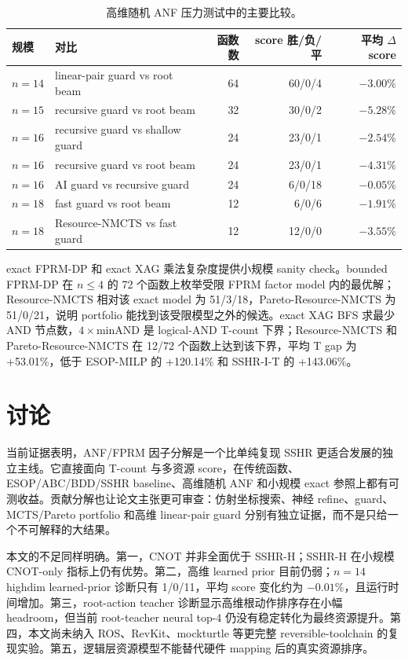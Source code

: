\documentclass[UTF8,fontset=macnew,11pt]{ctexart}
\newcommand{\method}{Resource-NMCTS}
\newcommand{\pareto}{Pareto-Resource-NMCTS}
\begin{document}
\begin{table}[t]
\centering
\small
\caption{高维随机 ANF 压力测试中的主要比较。}
\label{tab:highdim}
\begin{tabularx}{\linewidth}{llrrr}
\toprule
规模 & 对比 & 函数数 & score 胜/负/平 & 平均 $\Delta$ score \\
\midrule
$n=14$ & linear-pair guard vs root beam & 64 & 60/0/4 & $-3.00\%$ \\
$n=15$ & recursive guard vs root beam & 32 & 30/0/2 & $-5.28\%$ \\
$n=16$ & recursive guard vs shallow guard & 24 & 23/0/1 & $-2.54\%$ \\
$n=16$ & recursive guard vs root beam & 24 & 23/0/1 & $-4.31\%$ \\
$n=16$ & AI guard vs recursive guard & 24 & 6/0/18 & $-0.05\%$ \\
$n=18$ & fast guard vs root beam & 12 & 6/0/6 & $-1.91\%$ \\
$n=18$ & \method{} vs fast guard & 12 & 12/0/0 & $-3.55\%$ \\
\bottomrule
\end{tabularx}
\end{table}

exact FPRM-DP 和 exact XAG 乘法复杂度提供小规模 sanity check。bounded FPRM-DP 在 $n\leq4$ 的 72 个函数上枚举受限 FPRM factor model 内的最优解；\method{} 相对该 exact model 为 51/3/18，\pareto{} 为 51/0/21，说明 portfolio 能找到该受限模型之外的候选。exact XAG BFS 求最少 AND 节点数，$4\times\mathrm{minAND}$ 是 logical-AND T-count 下界；\method{} 和 \pareto{} 在 12/72 个函数上达到该下界，平均 T gap 为 +53.01\%，低于 ESOP-MILP 的 +120.14\% 和 SSHR-I-T 的 +143.06\%。

\section{讨论}

当前证据表明，ANF/FPRM 因子分解是一个比单纯复现 SSHR 更适合发展的独立主线。它直接面向 T-count 与多资源 score，在传统函数、ESOP/ABC/BDD/SSHR baseline、高维随机 ANF 和小规模 exact 参照上都有可测收益。贡献分解也让论文主张更可审查：仿射坐标搜索、神经 refine、guard、MCTS/Pareto portfolio 和高维 linear-pair guard 分别有独立证据，而不是只给一个不可解释的大结果。

本文的不足同样明确。第一，CNOT 并非全面优于 SSHR-H；SSHR-H 在小规模 CNOT-only 指标上仍有优势。第二，高维 learned prior 目前仍弱；$n=14$ highdim learned-prior 诊断只有 1/0/11，平均 score 变化约为 $-0.01\%$，且运行时间增加。第三，root-action teacher 诊断显示高维根动作排序存在小幅 headroom，但当前 root-teacher neural top-4 仍没有稳定转化为最终资源提升。第四，本文尚未纳入 ROS、RevKit、mockturtle 等更完整 reversible-toolchain 的复现实验。第五，逻辑层资源模型不能替代硬件 mapping 后的真实资源排序。
\end{document}
